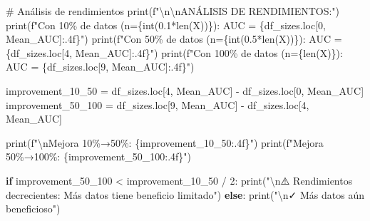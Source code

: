\documentclass[
  doc,
  floatsintext,
  longtable,
  a4paper,
  nolmodern,
  notxfonts,
  notimes,
  12pt,
  colorlinks=true,linkcolor=blue,citecolor=blue,urlcolor=blue]{apa7}
\newenvironment{Shaded}{\begin{snugshade}}{\end{snugshade}}
\newcommand{\BuiltInTok}[1]{\textcolor[rgb]{0.00,0.23,0.31}{#1}}
\newcommand{\CharTok}[1]{\textcolor[rgb]{0.13,0.47,0.30}{#1}}
\newcommand{\CommentTok}[1]{\textcolor[rgb]{0.37,0.37,0.37}{#1}}
\newcommand{\ControlFlowTok}[1]{\textcolor[rgb]{0.00,0.23,0.31}{\textbf{#1}}}
\newcommand{\DecValTok}[1]{\textcolor[rgb]{0.68,0.00,0.00}{#1}}
\newcommand{\FloatTok}[1]{\textcolor[rgb]{0.68,0.00,0.00}{#1}}
\newcommand{\NormalTok}[1]{\textcolor[rgb]{0.00,0.23,0.31}{#1}}
\newcommand{\OperatorTok}[1]{\textcolor[rgb]{0.37,0.37,0.37}{#1}}
\newcommand{\SpecialCharTok}[1]{\textcolor[rgb]{0.37,0.37,0.37}{#1}}
\newcommand{\SpecialStringTok}[1]{\textcolor[rgb]{0.13,0.47,0.30}{#1}}
\newcommand{\StringTok}[1]{\textcolor[rgb]{0.13,0.47,0.30}{#1}}
\begin{document}
\begin{Shaded}
\begin{Highlighting}[]
\CommentTok{\# Análisis de rendimientos}
\BuiltInTok{print}\NormalTok{(}\SpecialStringTok{f"}\CharTok{\textbackslash{}n\textbackslash{}n}\SpecialStringTok{ANÁLISIS DE RENDIMIENTOS:"}\NormalTok{)}
\BuiltInTok{print}\NormalTok{(}\SpecialStringTok{f"Con 10\% de datos (n=}\SpecialCharTok{\{}\BuiltInTok{int}\NormalTok{(}\FloatTok{0.1}\OperatorTok{*}\BuiltInTok{len}\NormalTok{(X))}\SpecialCharTok{\}}\SpecialStringTok{): AUC = }\SpecialCharTok{\{}\NormalTok{df\_sizes}\SpecialCharTok{.}\NormalTok{loc[}\DecValTok{0}\NormalTok{, }\StringTok{\textquotesingle{}Mean\_AUC\textquotesingle{}}\NormalTok{]}\SpecialCharTok{:.4f\}}\SpecialStringTok{"}\NormalTok{)}
\BuiltInTok{print}\NormalTok{(}\SpecialStringTok{f"Con 50\% de datos (n=}\SpecialCharTok{\{}\BuiltInTok{int}\NormalTok{(}\FloatTok{0.5}\OperatorTok{*}\BuiltInTok{len}\NormalTok{(X))}\SpecialCharTok{\}}\SpecialStringTok{): AUC = }\SpecialCharTok{\{}\NormalTok{df\_sizes}\SpecialCharTok{.}\NormalTok{loc[}\DecValTok{4}\NormalTok{, }\StringTok{\textquotesingle{}Mean\_AUC\textquotesingle{}}\NormalTok{]}\SpecialCharTok{:.4f\}}\SpecialStringTok{"}\NormalTok{)}
\BuiltInTok{print}\NormalTok{(}\SpecialStringTok{f"Con 100\% de datos (n=}\SpecialCharTok{\{}\BuiltInTok{len}\NormalTok{(X)}\SpecialCharTok{\}}\SpecialStringTok{): AUC = }\SpecialCharTok{\{}\NormalTok{df\_sizes}\SpecialCharTok{.}\NormalTok{loc[}\DecValTok{9}\NormalTok{, }\StringTok{\textquotesingle{}Mean\_AUC\textquotesingle{}}\NormalTok{]}\SpecialCharTok{:.4f\}}\SpecialStringTok{"}\NormalTok{)}

\NormalTok{improvement\_10\_50 }\OperatorTok{=}\NormalTok{ df\_sizes.loc[}\DecValTok{4}\NormalTok{, }\StringTok{\textquotesingle{}Mean\_AUC\textquotesingle{}}\NormalTok{] }\OperatorTok{{-}}\NormalTok{ df\_sizes.loc[}\DecValTok{0}\NormalTok{, }\StringTok{\textquotesingle{}Mean\_AUC\textquotesingle{}}\NormalTok{]}
\NormalTok{improvement\_50\_100 }\OperatorTok{=}\NormalTok{ df\_sizes.loc[}\DecValTok{9}\NormalTok{, }\StringTok{\textquotesingle{}Mean\_AUC\textquotesingle{}}\NormalTok{] }\OperatorTok{{-}}\NormalTok{ df\_sizes.loc[}\DecValTok{4}\NormalTok{, }\StringTok{\textquotesingle{}Mean\_AUC\textquotesingle{}}\NormalTok{]}

\BuiltInTok{print}\NormalTok{(}\SpecialStringTok{f"}\CharTok{\textbackslash{}n}\SpecialStringTok{Mejora 10\%→50\%: }\SpecialCharTok{\{}\NormalTok{improvement\_10\_50}\SpecialCharTok{:.4f\}}\SpecialStringTok{"}\NormalTok{)}
\BuiltInTok{print}\NormalTok{(}\SpecialStringTok{f"Mejora 50\%→100\%: }\SpecialCharTok{\{}\NormalTok{improvement\_50\_100}\SpecialCharTok{:.4f\}}\SpecialStringTok{"}\NormalTok{)}

\ControlFlowTok{if}\NormalTok{ improvement\_50\_100 }\OperatorTok{\textless{}}\NormalTok{ improvement\_10\_50 }\OperatorTok{/} \DecValTok{2}\NormalTok{:}
    \BuiltInTok{print}\NormalTok{(}\StringTok{"}\CharTok{\textbackslash{}n}\StringTok{⚠️  Rendimientos decrecientes: Más datos tiene beneficio limitado"}\NormalTok{)}
\ControlFlowTok{else}\NormalTok{:}
    \BuiltInTok{print}\NormalTok{(}\StringTok{"}\CharTok{\textbackslash{}n}\StringTok{✓ Más datos aún beneficioso"}\NormalTok{)}
\end{Highlighting}
\end{Shaded}
\end{document}
